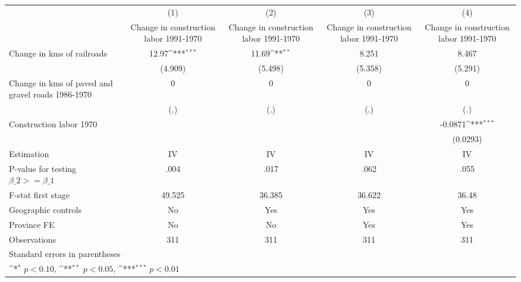 {
\def\sym#1{\ifmmode^{#1}\else\(^{#1}\)\fi}
\begin{tabular}{l*{4}{c}}
\hline\hline
                &\multicolumn{1}{c}{(1)}&\multicolumn{1}{c}{(2)}&\multicolumn{1}{c}{(3)}&\multicolumn{1}{c}{(4)}\\
                &\multicolumn{1}{c}{Change in construction labor 1991-1970}&\multicolumn{1}{c}{Change in construction labor 1991-1970}&\multicolumn{1}{c}{Change in construction labor 1991-1970}&\multicolumn{1}{c}{Change in construction labor 1991-1970}\\
\hline
Change in kms of railroads&    12.97\sym{***}&    11.69\sym{**} &    8.251         &    8.467         \\
                &  (4.909)         &  (5.498)         &  (5.358)         &  (5.291)         \\
[1em]
Change in kms of paved and gravel roads 1986-1970&        0         &        0         &        0         &        0         \\
                &      (.)         &      (.)         &      (.)         &      (.)         \\
[1em]
Construction labor 1970&                  &                  &                  &  -0.0871\sym{***}\\
                &                  &                  &                  & (0.0293)         \\
\hline
Estimation      &       IV         &       IV         &       IV         &       IV         \\
P-value for testing $\beta\_2 >= \beta\_1$&     .004         &     .017         &     .062         &     .055         \\
F-stat first stage&   49.525         &   36.385         &   36.622         &    36.48         \\
Geographic controls&       No         &      Yes         &      Yes         &      Yes         \\
Province FE     &       No         &       No         &      Yes         &      Yes         \\
Observations    &      311         &      311         &      311         &      311         \\
\hline\hline
\multicolumn{5}{l}{\footnotesize Standard errors in parentheses}\\
\multicolumn{5}{l}{\footnotesize \sym{*} \(p<0.10\), \sym{**} \(p<0.05\), \sym{***} \(p<0.01\)}\\
\end{tabular}
}
